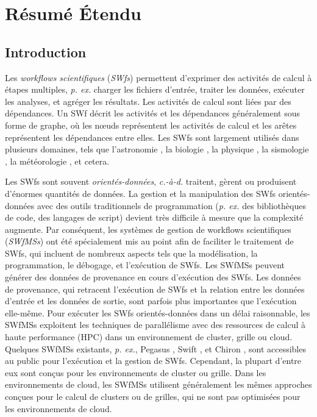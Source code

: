 \chapter{Résumé Étendu}
\section*{Introduction}
Les \textit{workflows scientifiques} (\textit{SWfs}) permettent d'exprimer des activités de calcul à étapes multiples, \textit{p. ex.} charger les fichiers d'entrée, traiter les données, exécuter les analyses, et agréger les résultats. Les activités de calcul sont liées par des dépendances. Un SWf décrit les activités et les dépendances généralement sous forme de graphe, où les nœuds représentent les activités de calcul et les arêtes représentent les dépendances entre elles. Les SWfs sont largement utilisés dans plusieurs domaines, tels que l'astronomie \cite{Deelman2008}, la biologie \cite{Ocana2012}, la physique \cite{Ogasawara2011}, la sismologie \cite{Deelman2006z}, la météorologie \cite{Woitaszek2011}, et cetera. 

Les SWfs sont souvent \textit{orientés-données}, \textit{c.-à-d.} traitent, gèrent ou produisent d'énormes quantités de données. La gestion et la manipulation des SWfs orientés-données avec des outils traditionnels de programmation (\textit{p. ex.} des bibliothèques de code, des langages de script) devient très difficile à mesure que la complexité augmente. 
Par conséquent, les systèmes de gestion de workflows scientifiques (\textit{SWfMSs}) ont été spécialement mis au point afin de faciliter le traitement de SWfs, qui incluent de nombreux aspects tels que la modélisation, la programmation, le débogage, et l'exécution de SWfs. Les SWfMSs peuvent générer des données de provenance en cours d'exécution des SWfs. Les données de provenance, qui retracent l'exécution de SWfs et la relation entre les données d'entrée et les données de sortie, sont parfois plus importantes que l'exécution elle-même. Pour exécuter les SWfs orientés-données dans un délai raisonnable, les SWfMSs exploitent les techniques de parallélisme avec des ressources de calcul à haute performance (HPC) dans un environnement de cluster, grille ou cloud. Quelques SWfMSs existants, \textit{p. ex.}, Pegasus \cite{Deelman2005,Deelman2014}, Swift \cite{Zhao2007}, et Chiron \cite{Ogasawara2013}, sont accessibles au public pour l'exécution et la gestion de SWfs. Cependant, la plupart d'entre eux sont conçus pour les environnements de cluster ou grille. Dans les environnements de cloud, les SWfMSs utilisent généralement les mêmes approches conçues pour le calcul de clusters ou de grilles, qui ne sont pas optimisées pour les environnements de cloud.

